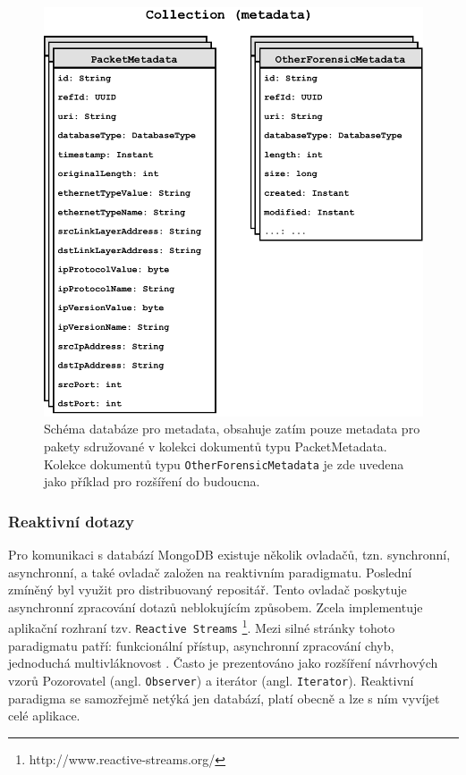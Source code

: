 \begin{figure}[!h]
  \centering
  \includegraphics[width=12cm]{template-fig/MetadataSchema.pdf}
  \caption{Schéma databáze pro metadata, obsahuje zatím pouze metadata pro pakety sdružované v kolekci dokumentů typu PacketMetadata. Kolekce dokumentů typu \texttt{OtherForensicMetadata} je zde uvedena jako příklad pro rozšíření do budoucna.}
  \label{FIG_MetadataSchema}
\end{figure}

\subsubsection{Reaktivní dotazy}
Pro komunikaci s databází MongoDB existuje několik ovladačů, tzn. synchronní, asynchronní, a také ovladač založen na reaktivním paradigmatu. Poslední zmíněný byl využit pro distribuovaný repositář. Tento ovladač poskytuje asynchronní zpracování dotazů neblokujícím způsobem. Zcela implementuje aplikační rozhraní tzv. \texttt{Reactive Streams} \footnote{http://www.reactive-streams.org/}. Mezi silné stránky tohoto paradigmatu patří: funkcionální přístup, asynchronní zpracování chyb, jednoduchá multivláknovost \cite{oficReactiveX}. Často je prezentováno jako rozšíření návrhových vzorů Pozorovatel (angl. \texttt{Observer}) a iterátor (angl. \texttt{Iterator}). Reaktivní paradigma se samozřejmě netýká jen databází, platí obecně a lze s ním vyvíjet celé aplikace.

